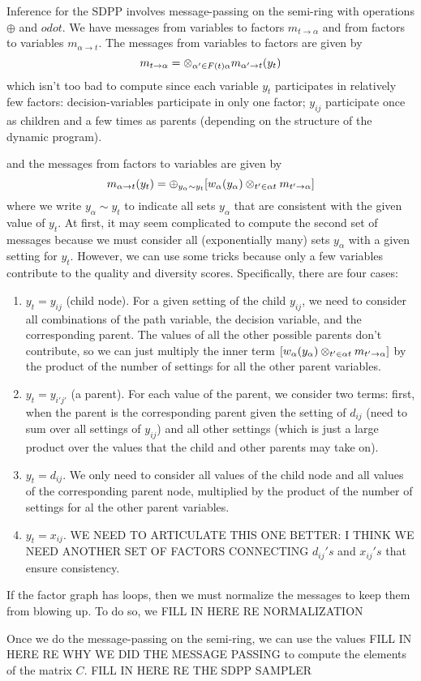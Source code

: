\documentclass[idxtotoc,hyperref,openany]{labbook} %
\begin{document}
Inference for the SDPP involves message-passing on the semi-ring with
operations $\oplus$ and $odot$.  We have messages from variables to
factors $m_{t \rightarrow \alpha}$ and from factors to variables
$m_{\alpha \rightarrow t}$.  The messages from variables to factors
are given by
\[
m_{t \rightarrow \alpha} = \otimes_{\alpha' \in F(t)\\ \alpha} m_{\alpha' \rightarrow t}(y_t)
\]
which isn't too bad to compute since each variable $y_t$ participates
in relatively few factors: decision-variables participate in only one
factor; $y_{ij}$ participate once as children and a few times as
parents (depending on the structure of the dynamic program).

and the messages from factors to variables are given by 
\[
m_{\alpha \rightarrow t}(y_t) = \oplus_{y_\alpha \sim y_t} [ w_\alpha( y_\alpha ) \otimes_{t' \in \alpha \\t} m_{t' \rightarrow \alpha} ]
\]
where we write $y_\alpha \sim y_t$ to indicate all sets $y_\alpha$
that are consistent with the given value of $y_t$.  At first, it may
seem complicated to compute the second set of messages because we must
consider all (exponentially many) sets $y_\alpha$ with a given setting
for $y_t$.  However, we can use some tricks because only a few
variables contribute to the quality and diversity scores.
Specifically, there are four cases:
\begin{enumerate}
\item $y_t = y_{ij}$ (child node).  For a given setting of the child
  $y_{ij}$, we need to consider all combinations of the path variable,
  the decision variable, and the corresponding parent.  The values of
  all the other possible parents don't contribute, so we can just
  multiply the inner term $[ w_\alpha( y_\alpha ) \otimes_{t' \in
      \alpha \\t} m_{t' \rightarrow \alpha} ]$ by the product of the
  number of settings for all the other parent variables.
\item $y_t = y_{i'j'}$ (a parent).  For each value of the parent, we
  consider two terms: first, when the parent is the corresponding
  parent given the setting of $d_{ij}$ (need to sum over all settings
  of $y_{ij}$) and all other settings (which is just a large product
  over the values that the child and other parents may take on).
\item $y_t = d_{ij}$.  We only need to consider all values of the
  child node and all values of the corresponding parent node,
  multiplied by the product of the number of settings for al the other
  parent variables.
\item $y_t = x_{ij}$. WE NEED TO ARTICULATE THIS ONE BETTER: I THINK
  WE NEED ANOTHER SET OF FACTORS CONNECTING $d_{ij}'s$ and $x_{ij}'s$
  that ensure consistency.
\end{enumerate}

If the factor graph has loops, then we must normalize the messages to
keep them from blowing up.  To do so, we
FILL IN HERE RE NORMALIZATION

Once we do the message-passing on the semi-ring, we can use the values
FILL IN HERE RE WHY WE DID THE MESSAGE PASSING
to compute the elements of the matrix $C$.
FILL IN HERE RE THE SDPP SAMPLER
\end{document}
